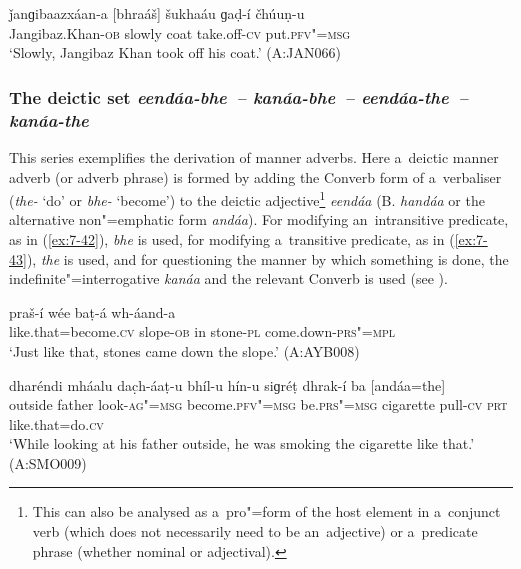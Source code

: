 \begin{exe}
\ex
\label{ex:7-41}
\gll ǰanɡibaazxáan-a [bhraáš] šukhaáu ɡaḍ-í čhúuṇ-u \\
Jangibaz.Khan-\textsc{ob} slowly coat take.off-\textsc{cv} put.\textsc{pfv"=msg}  \\
\glt `Slowly, Jangibaz Khan took off his coat.' (A:JAN066)
\end{exe}

\subsubsection*{The deictic set \textit{eendáa-bhe~-- kanáa-bhe~-- eendáa-the~--
    kanáa-the}}

This series exemplifies the derivation of manner adverbs. Here a~deictic manner adverb (or adverb
phrase) is formed by adding the Converb form of a~verbaliser (\textit{the-} `do' or \textit{bhe-}
`become') to the deictic adjective\footnote{This can also be analysed as a~pro"=form of the host
  element in a~conjunct verb (which does not necessarily need to be an~adjective) or a~predicate
  phrase (whether nominal or adjectival).} \textit{eendáa} (B. \textit{handáa} or the alternative
non"=emphatic form \textit{andáa}). For modifying an~intransitive predicate, as in (\ref{ex:7-42}),
\textit{bhe} is used, for modifying a~transitive predicate, as in (\ref{ex:7-43}), \textit{the} is
used, and for questioning the manner by which something is done, the indefinite"=interrogative
\textit{kanáa} and the relevant Converb is used (see ).

\begin{exe}
\ex
\label{ex:7-42}
\gll [andáa=bhe] praš-í wée baṭ-á wh-áand-a \\
like.that=become.\textsc{cv} slope-\textsc{ob} in stone-\textsc{pl} come.down-\textsc{prs"=mpl} \\
\glt `Just like that, stones came down the slope.' (A:AYB008)
\end{exe}
\begin{exe}
\ex
\label{ex:7-43}
\gll dharéndi mháalu dac̣h-áaṭ-u bhíl-u hín-u  siɡréṭ dhrak-í ba [andáa=the] \\
outside father look-\textsc{ag"=msg} become.\textsc{pfv"=msg} be.\textsc{prs"=msg} cigarette pull-\textsc{cv} \textsc{prt} like.that=do.\textsc{cv}  \\
\glt `While looking at his father outside, he was smoking the cigarette like that.' (A:SMO009)
\end{exe}

